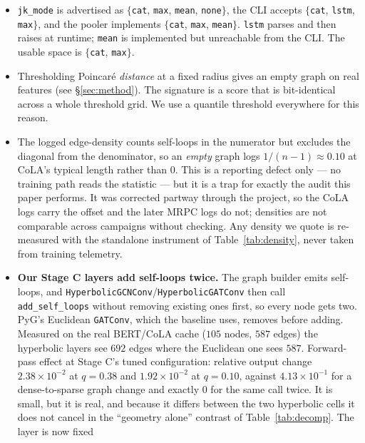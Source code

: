 \documentclass{article}
\begin{document}
\begin{itemize}
\itemsep1pt
\item \texttt{jk\_mode} is advertised as $\{$\texttt{cat}, \texttt{max},
      \texttt{mean}, \texttt{none}$\}$, the CLI accepts $\{$\texttt{cat},
      \texttt{lstm}, \texttt{max}$\}$, and the pooler implements
      $\{$\texttt{cat}, \texttt{max}, \texttt{mean}$\}$. \texttt{lstm} parses
      and then raises at runtime; \texttt{mean} is implemented but unreachable
      from the CLI. The usable space is $\{$\texttt{cat}, \texttt{max}$\}$.
\item Thresholding Poincar\'e \emph{distance} at a fixed radius gives an empty
      graph on real features (see \S\ref{sec:method}). The signature is a score
      that is bit-identical across a whole threshold grid. We use a quantile
      threshold everywhere for this reason.
\item The logged edge-density counts self-loops in the numerator but excludes
      the diagonal from the denominator, so an \emph{empty} graph logs
      $1/(n{-}1) \approx 0.10$ at CoLA's typical length rather than $0$. This is
      a reporting defect only --- no training path reads the statistic --- but
      it is a trap for exactly the audit this paper performs. It was corrected
      partway through the project, so the CoLA logs carry the offset and the
      later MRPC logs do not; densities are not comparable across campaigns
      without checking. Any density we quote is re-measured with the standalone
      instrument of Table~\ref{tab:density}, never taken from training
      telemetry.
\item \textbf{Our Stage C layers add self-loops twice.} The graph builder emits
      self-loops, and \texttt{HyperbolicGCNConv}/\texttt{HyperbolicGATConv} then
      call \texttt{add\_self\_loops} without removing existing ones first, so
      every node gets two. PyG's Euclidean \texttt{GATConv}, which the baseline
      uses, removes before adding. Measured on the real BERT/CoLA cache ($105$
      nodes, $587$ edges) the hyperbolic layers see $692$ edges where the
      Euclidean one sees $587$. Forward-pass effect at Stage C's tuned
      configuration: relative output change $2.38\times10^{-2}$ at $q{=}0.38$
      and $1.92\times10^{-2}$ at $q{=}0.10$, against $4.13\times10^{-1}$ for a
      dense-to-sparse graph change and exactly $0$ for the same call twice. It
      is small, but it is real, and because it differs between the two
      hyperbolic cells it does not cancel in the ``geometry alone'' contrast of
      Table~\ref{tab:decomp}. The layer is now fixed

\end{itemize}
\end{document}
